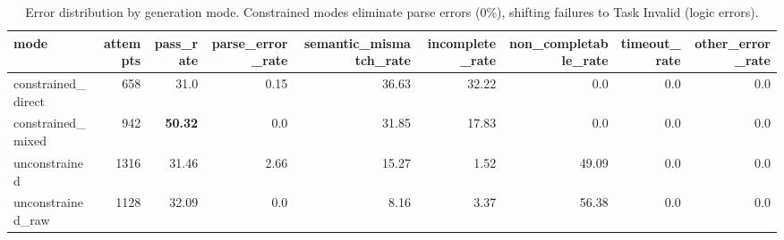 \begin{table}[htbp]
  \centering
  \caption{Error distribution by generation mode. Constrained modes eliminate parse errors (0\%), shifting failures to Task Invalid (logic errors).}
  \label{tab:error_breakdown}
  \begin{tabular}{lrrrrrrrr}
    \toprule
    mode & attempts & pass\_rate & parse\_error\_rate & semantic\_mismatch\_rate & incomplete\_rate & non\_completable\_rate & timeout\_rate & other\_error\_rate \\
    \midrule
    constrained\_direct & 658 & 31.0 & 0.15 & 36.63 & 32.22 & 0.0 & 0.0 & 0.0 \\
    constrained\_mixed & 942 & \textbf{50.32} & 0.0 & 31.85 & 17.83 & 0.0 & 0.0 & 0.0 \\
    unconstrained & 1316 & 31.46 & 2.66 & 15.27 & 1.52 & 49.09 & 0.0 & 0.0 \\
    unconstrained\_raw & 1128 & 32.09 & 0.0 & 8.16 & 3.37 & 56.38 & 0.0 & 0.0 \\
    \bottomrule
  \end{tabular}
\end{table}